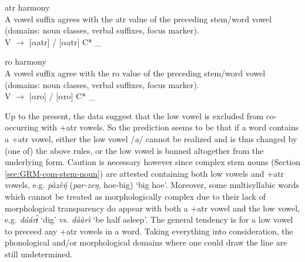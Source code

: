 \begin{Rule}\label{RULE-atr}{{\sc atr} harmony}\\
A vowel suffix agrees with the {\sc atr} value of   the preceding stem/word 
vowel (domains: noun classes, verbal suffixes, focus marker).\\
V $\rightarrow$ $[\alpha${\sc atr}$]$  / $[\alpha${\sc atr}$]$ C* \_
\end{Rule}


\begin{Rule}\label{RULE-ro}{{\sc ro} harmony}\\
A vowel suffix  agree with the {\sc ro} value of  the   preceding stem/word
 vowel (domains: noun classes, verbal suffixes, focus marker).\\
V $\rightarrow$ [$\alpha${\sc ro}]  / [$\alpha${\sc ro}] C* \_
\end{Rule}

Up to the present, the data suggest that the low vowel is excluded from 
co-occurring with {\sc +atr}  vowels.  So the prediction seems to be that if a 
word contains a {\sc +atr} vowel,  either the low vowel {/{\it a}/} cannot be 
realized and is thus changed by (one of) the above rules, or  the  low vowel is 
banned  altogether from the underlying form. Caution is necessary however since 
complex stem nouns (Section \ref{sec:GRM-com-stem-noun}) are attested containing 
both  low vowels and {\sc +atr} vowels, e.g. {\it pàzèŋ́} ({\it par-zeŋ}, {\sc 
hoe-big})  `big hoe'. Moreover, some multisyllabic words which cannot be treated 
as morphologically complex  due to their lack of morphological transparency do 
appear with both  a {\sc +atr} vowel and  the low vowel, e.g. {\it dáárɪ́}  
`dig' vs.  {\it dààrì}  `be half asleep'. The general tendency is for a low 
vowel to preceed any {\sc +atr} vowels in a word. Taking everything into 
consideration, the phonological and/or morphological domains where one could 
draw the line are still undetermined.



